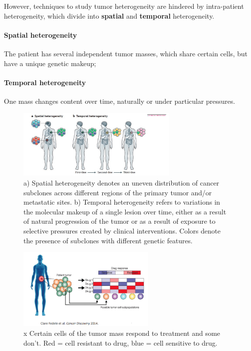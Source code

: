 However, techniques to study tumor heterogeneity are hindered by intra-patient heterogeneity, which divide into \textbf{spatial} and \textbf{temporal} heterogeneity.

\paragraph*{Spatial heterogeneity}
	The patient has several independent tumor masses, which share certain cells, but have a unique genetic makeup;

\paragraph*{Temporal heterogeneity}
	One mass changes content over time, naturally or under particular pressures.


\begin{figure}[H]
	\centering
	\includegraphics[width=0.7\textwidth]{heterogeneity.png}
	\caption{a) Spatial heterogeneity denotes an uneven distribution of cancer subclones across different regions of the primary tumor and/or metastatic sites. b) Temporal heterogeneity refers to variations in the molecular makeup of a single lesion over time, either as a result of natural progression of the tumor or as a result of exposure to selective pressures created by clinical interventions. Colors denote the presence of subclones with different genetic features.}
	\label{fig:hetero}
\end{figure}

\begin{figure}[H]
	\centering
	\includegraphics[width=0.6\textwidth]{treatment.png}
	\caption{x Certain cells of the tumor mass respond to treatment and some don't. Red = cell resistant to drug, blue = cell sensitive to drug. }
	\label{fig:hetero}
\end{figure}

